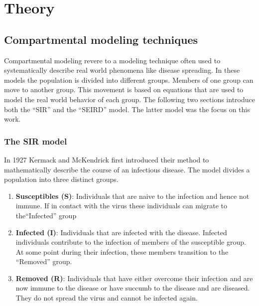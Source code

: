 
\chapter{Theory} %

\label{chap:theory} %


\section{Compartmental modeling techniques}
Compartmental modeling revere to a modeling technique often used to systematically describe real world phenomena
like disease spreading\cite{compartementMod}. In these models the population is divided into different groups. 
Members of one group can move to another group. This movement is based on equations that are used to model the real
world behavior of each group. The following two sections introduce both the ``SIR'' and the ``SEIRD'' model. The
latter model was the focus on this work.

\subsection{The SIR model}
\label{sec:SIR}
In 1927 Kermack and McKendrick\cite{kermack1991contributions} first introduced their method to mathematically describe  
the course  of an infectious disease. The model divides a population into three distinct groups.

\begin{enumerate}[label=$\bullet$]
	\item \textbf{Susceptibles (S)}: Individuals that are naive to the infection and hence not immune. If in contact with
		the virus these individuals can migrate to the\linebreak ``Infected'' group
	\item \textbf{Infected (I)}: Individuals that are infected with the disease. Infected individuals contribute to the 
		infection of members of the susceptible group. At some point during their infection, these members
		transition to the ``Removed'' group.
	\item \textbf{Removed (R)}: Individuals that  have either overcome their infection and are now immune to the disease
		or have succumb to the disease and are diseased. They do not spread the virus and cannot be infected again.
\end{enumerate}

